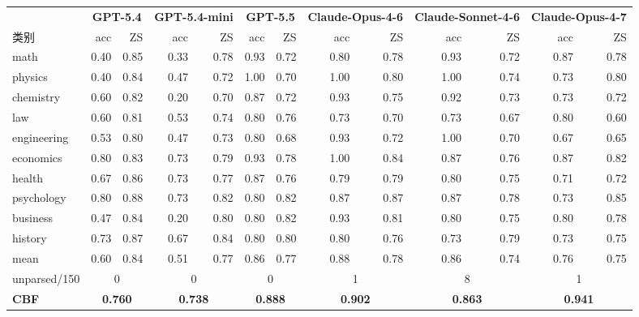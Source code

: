 \documentclass[11pt,a4paper,fontset=fandol]{ctexart}
\begin{document}
\begin{table}[h]
\centering
\scriptsize
\setlength{\tabcolsep}{3pt}
\begin{tabular}{l rr rr rr rr rr rr}
\toprule
& \multicolumn{2}{c}{\textbf{GPT-5.4}} & \multicolumn{2}{c}{\textbf{GPT-5.4-mini}} & \multicolumn{2}{c}{\textbf{GPT-5.5}} & \multicolumn{2}{c}{\textbf{Claude-Opus-4-6}} & \multicolumn{2}{c}{\textbf{Claude-Sonnet-4-6}} & \multicolumn{2}{c}{\textbf{Claude-Opus-4-7}} \\
\cmidrule(lr){2-3}\cmidrule(lr){4-5}\cmidrule(lr){6-7}\cmidrule(lr){8-9}\cmidrule(lr){10-11}\cmidrule(lr){12-13}
类别 & acc & ZS & acc & ZS & acc & ZS & acc & ZS & acc & ZS & acc & ZS \\
\midrule
math        & 0.40 & 0.85 & 0.33 & 0.78 & 0.93 & 0.72 & 0.80 & 0.78 & 0.93 & 0.72 & 0.87 & 0.78 \\
physics     & 0.40 & 0.84 & 0.47 & 0.72 & 1.00 & 0.70 & 1.00 & 0.80 & 1.00 & 0.74 & 0.73 & 0.80 \\
chemistry   & 0.60 & 0.82 & 0.20 & 0.70 & 0.87 & 0.72 & 0.93 & 0.75 & 0.92 & 0.73 & 0.73 & 0.72 \\
law         & 0.60 & 0.81 & 0.53 & 0.74 & 0.80 & 0.76 & 0.73 & 0.70 & 0.73 & 0.67 & 0.80 & 0.60 \\
engineering & 0.53 & 0.80 & 0.47 & 0.73 & 0.80 & 0.68 & 0.93 & 0.72 & 1.00 & 0.70 & 0.67 & 0.65 \\
economics   & 0.80 & 0.83 & 0.73 & 0.79 & 0.93 & 0.78 & 1.00 & 0.84 & 0.87 & 0.76 & 0.87 & 0.82 \\
health      & 0.67 & 0.86 & 0.73 & 0.77 & 0.87 & 0.76 & 0.79 & 0.79 & 0.80 & 0.75 & 0.71 & 0.72 \\
psychology  & 0.80 & 0.88 & 0.73 & 0.82 & 0.80 & 0.82 & 0.87 & 0.87 & 0.87 & 0.78 & 0.73 & 0.85 \\
business    & 0.47 & 0.84 & 0.20 & 0.80 & 0.80 & 0.82 & 0.93 & 0.81 & 0.80 & 0.75 & 0.80 & 0.78 \\
history     & 0.73 & 0.87 & 0.67 & 0.84 & 0.80 & 0.80 & 0.80 & 0.76 & 0.73 & 0.79 & 0.73 & 0.75 \\
\midrule
mean        & 0.60 & 0.84 & 0.51 & 0.77 & 0.86 & 0.77 & 0.88 & 0.78 & 0.86 & 0.74 & 0.76 & 0.75 \\
\midrule
unparsed/150 & \multicolumn{2}{c}{0} & \multicolumn{2}{c}{0} & \multicolumn{2}{c}{0} & \multicolumn{2}{c}{1} & \multicolumn{2}{c}{8} & \multicolumn{2}{c}{1} \\
\midrule
\textbf{CBF} & \multicolumn{2}{c}{\textbf{0.760}} & \multicolumn{2}{c}{\textbf{0.738}} & \multicolumn{2}{c}{\textbf{0.888}} & \multicolumn{2}{c}{\textbf{0.902}} & \multicolumn{2}{c}{\textbf{0.863}} & \multicolumn{2}{c}{\textbf{0.941}} \\
\bottomrule
\end{tabular}
\end{table}
\end{document}
